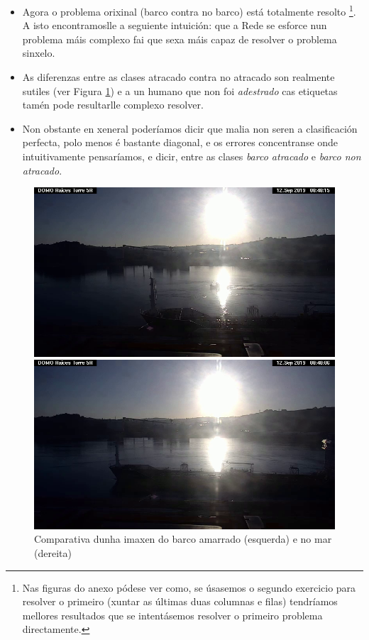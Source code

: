\documentclass{article}
\begin{document}
\begin{itemize}
	\item Agora o problema orixinal (barco contra no barco) está totalmente resolto \footnote{Nas figuras do anexo pódese ver como, se úsasemos o segundo exercicio para resolver o primeiro (xuntar as últimas duas columnas e filas) tendríamos mellores resultados que se intentásemos resolver o primeiro problema directamente.}. A isto encontramoslle a seguiente intuición: que a Rede se esforce nun problema máis complexo fai que sexa máis capaz de resolver o problema sinxelo.
	\item As diferenzas entre as clases atracado contra no atracado son realmente sutiles (ver Figura \ref{fig:comparativaDoked}) e a un humano que non foi \emph{adestrado} cas etiquetas tamén pode resultarlle complexo resolver. 
	\item Non obstante en xeneral poderíamos dicir que malia non seren a clasificación perfecta, polo  menos é bastante diagonal, e os errores concentranse onde intuitivamente pensaríamos, e dicir, entre as clases \emph{barco atracado} e \emph{barco non atracado}.
\end{itemize}


\begin{figure}[h]
	\centering
	\begin{minipage}{0.45\textwidth}
		\centering
		\includegraphics[width=\linewidth]{docked.jpg}
	\end{minipage}
	\hfill
	\begin{minipage}{0.45\textwidth}
		\centering
		\includegraphics[width=\linewidth]{undocked.jpg}
	\end{minipage}
	\label{fig:comparativaDoked}
	\caption{Comparativa dunha imaxen do barco amarrado (esquerda) e no mar (dereita)}
\end{figure}
\end{document}
